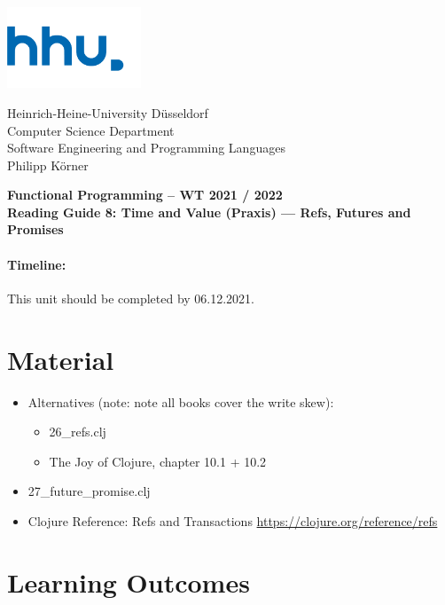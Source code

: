 \documentclass[11pt,a4paper]{article}
\begin{document}
\begin{minipage}[b]{\textwidth}
	\parbox[t]{5cm}{%
		\includegraphics[width=4cm]{unilogo}
		\hfill
	}
	\parbox[b]{11cm}{%
		Heinrich-Heine-University D\"usseldorf\\
		Computer Science Department\\
		Software Engineering and Programming Languages\\
		Philipp K\"orner
	}
\end{minipage}
\begin{center}
	\bf
	Functional Programming -- WT 2021 / 2022\\
	Reading Guide 8: Time and Value (Praxis) --- Refs, Futures and Promises
\end{center}

\pagestyle{empty}

\paragraph{Timeline:} This unit should be completed by 06.12.2021.

\section{Material} 

\begin{itemize}
    \item Alternatives (note: note all books cover the write skew):
        \begin{itemize}
            \item 26\_refs.clj
            \item The Joy of Clojure, chapter 10.1 + 10.2
        \end{itemize}
            \item 27\_future\_promise.clj
    \item Clojure Reference: Refs and Transactions \url{https://clojure.org/reference/refs}
\end{itemize}


\section{Learning Outcomes}
\end{document}
